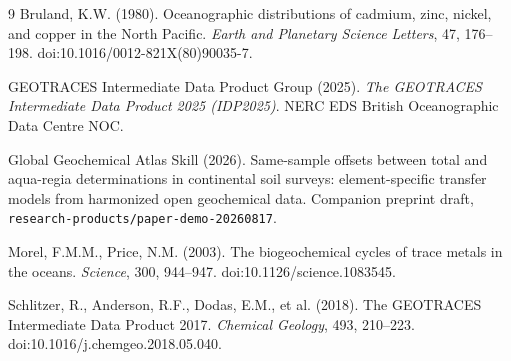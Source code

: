 \documentclass[11pt]{article}
\begin{document}
\begin{thebibliography}{9}
Bruland, K.W. (1980). Oceanographic distributions of cadmium, zinc, nickel,
and copper in the North Pacific. \emph{Earth and Planetary Science
Letters}, 47, 176--198. doi:10.1016/0012-821X(80)90035-7.

GEOTRACES Intermediate Data Product Group (2025). \emph{The GEOTRACES
Intermediate Data Product 2025 (IDP2025)}. NERC EDS British Oceanographic
Data Centre NOC.

Global Geochemical Atlas Skill (2026). Same-sample offsets between total
and aqua-regia determinations in continental soil surveys: element-specific
transfer models from harmonized open geochemical data. Companion preprint
draft, \texttt{research-products/paper-demo-20260817}.

Morel, F.M.M., Price, N.M. (2003). The biogeochemical cycles of trace
metals in the oceans. \emph{Science}, 300, 944--947.
doi:10.1126/science.1083545.

Schlitzer, R., Anderson, R.F., Dodas, E.M., et al. (2018). The GEOTRACES
Intermediate Data Product 2017. \emph{Chemical Geology}, 493, 210--223.
doi:10.1016/j.chemgeo.2018.05.040.
\end{thebibliography}
\end{document}
